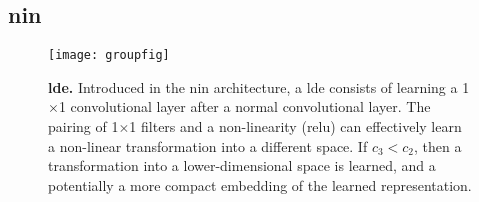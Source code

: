 \documentclass[thesis]{subfiles}
\begin{document}
\subsection{\gls{nin}}
\begin{figure}[tbp]
    \centering
    \texttt{[image: groupfig]}
    \caption[Low-dimensional embedding]{\textbf{\acrlong{lde}.} Introduced in the \gls{nin} architecture, a \gls{lde} consists of learning a 1$\times$1 convolutional layer after a normal convolutional layer. The pairing of 1$\times$1 filters and a non-linearity (\ie \gls{relu}) can effectively learn a non-linear transformation into a different space. If $c_3 < c_2$, then a transformation into a lower-dimensional space is learned, and a potentially a more compact embedding of the learned representation.}\label{fig:lowdimembedding}
\end{figure}
\end{document}
